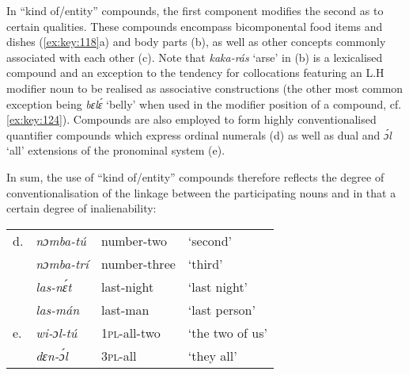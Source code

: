 In “kind of/entity” compounds, the first component modifies the second as to certain qualities. These compounds encompass bicomponental food items and dishes (\ref{ex:key:118}a) and body parts (b), as well as other concepts commonly associated with each other (c). Note that \textit{kaka-rás} ‘arse’ in (b) is a lexicalised compound and an exception to the tendency for collocations featuring an L.H modifier noun to be realised as associative constructions (the other most common exception being \textit{bɛlɛ́} ‘belly’ when used in the modifier position of a compound, cf. \ref{ex:key:124}). Compounds are also employed to form highly conventionalised quantifier compounds which express ordinal numerals{\fff} (d) as well as dual and \textit{ɔ́l} ‘all’ extensions of the pronominal system (e).



In sum, the use of “kind of/entity” compounds therefore reflects the degree of conventionalisation of the linkage between the participating nouns and in that a certain degree of inalienability:



\begin{exe}
\sn
\begin{tabularx}{.9\textwidth}{lXXX}
d. & \itshape nɔmba-tú & number-two & ‘second’\\
& \itshape nɔmba-trí & number-three & ‘third’\\
& \itshape las-nɛ́t & last-night & ‘last night’\\
& \itshape las-mán & last-man & ‘last person’\\
e. & \itshape wi-ɔl-tú & \textsc{1pl}{}-all-two & ‘the two of us’\\
& \itshape dɛn-ɔ́l & \textsc{3pl}{}-all & ‘they all’\\
\end{tabularx}
\end{exe}

